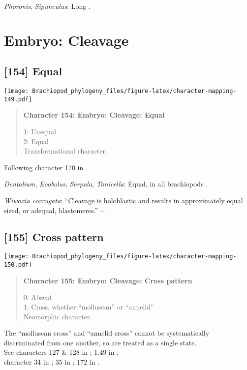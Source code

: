 \documentclass[openany]{book}
\theoremstyle{definition}
\theoremstyle{definition}
\theoremstyle{definition}
\theoremstyle{remark}
\begin{document}
\hypertarget{Phoronis-coding-153}{}
\emph{Phoronis}, \emph{Sipunculus}: Long \citep{Franzen1981}.

\section{Embryo: Cleavage}\label{embryo-cleavage}

\subsection*{{[}154{]} Equal}\label{equal}

\texttt{[image: Brachiopod\_phylogeny\_files/figure-latex/character-mapping-149.pdf]}

\begin{quote}
\textbf{Character 154: Embryo: Cleavage: Equal}

1: Unequal\\
2: Equal\\
Transformational character.
\end{quote}

Following character 170 in \citet{Giribet2002}.

\hypertarget{Dentalium-coding-154}{}
\emph{Dentalium}, \emph{Eoobolus}, \emph{Serpula}, \emph{Tonicella}:
Equal, in all brachiopods \citep{Williams1997Introduction}.

\hypertarget{Wiwaxia_corrugata-coding-154}{}
\emph{Wiwaxia corrugata}: ``Cleavage is holoblastic and results in
approximately equal sized, or adequal, blastomeres.'' --
\citet{Pennerstorfer2012}.

\subsection*{{[}155{]} Cross pattern}\label{cross-pattern}

\texttt{[image: Brachiopod\_phylogeny\_files/figure-latex/character-mapping-150.pdf]}

\begin{quote}
\textbf{Character 155: Embryo: Cleavage: Cross pattern}

0: Absent\\
1: Cross, whether ``molluscan'' or ``annelid''\\
Neomorphic character.
\end{quote}

The ``molluscan cross'' and ``annelid cross'' cannot be systematically
discriminated from one another, so are treated as a single state.\\
See characters 127 \& 128 in \citet{Rouse1999}; 1.49 in
\citet{SPS1996};\\
character 34 in \citet{Haszprunar1996}; 35 in \citet{Haszprunar2000};
172 in \citet{Giribet2002}.
\end{document}
